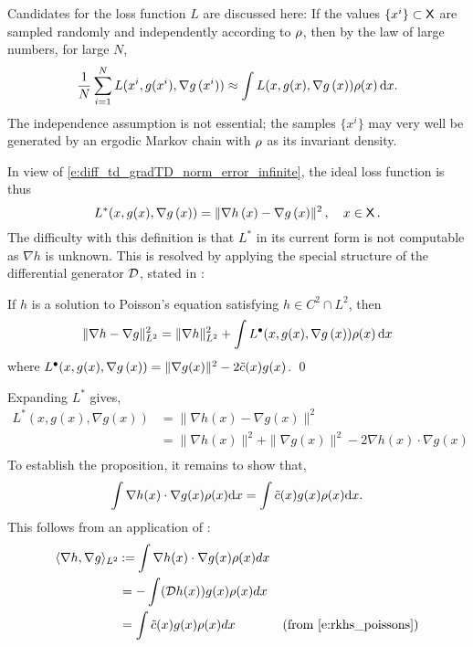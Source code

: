 Candidates for the loss function $L$ are discussed here: 
If the values $\{x^i\} \subset {\sf X} $  are sampled randomly and independently according to $\rho$,  then by the law of large numbers, for large $N$,
\begin{equation}
\frac{1}{N} \sum_{i=1}^N L(x^i, g(x^i), \nabla g\, (x^i))  \approx
\int  L(x, g(x), \nabla g\, (x))  \rho(x)\, \text{d} x.
\end{equation}
The independence assumption is not essential; the samples $\{x^i\}$ may very well be generated by an ergodic Markov chain with $\rho$ as its invariant density. 

In view of \eqref{e:diff_td_gradTD_norm_error_infinite}, the ideal loss function is thus
\begin{equation}
L^*(x,g(x) ,\nabla g \,(x))  =         \| \nabla h\,(x)  -\nabla g\, (x) \|^2\,, \quad x\in\state\,.
\label{e:rkhs_IdealLoss}
\end{equation}
The difficulty with this definition is that $L^*$ in its current form is not computable as $\nabla h$ is unknown. This is resolved by applying the special structure of the differential generator ${\cal D}$,  stated in :
\begin{proposition}
	\label{prop:gradTD_erm_loss}
	If $h$ is a solution to Poisson's equation satisfying $h\in C^2\cap L^2$, then
	\[
	\| \nabla h -  \nabla g\|^2_{L^2} =\| \nabla h  \|^2_{L^2} + \int   L^\bullet(x, g(x), \nabla g\, (x)) \rho(x)\, \text{d} x
	\]
	where
	$ L^\bullet(x, g(x), \nabla g\, (x)) =   \| \nabla g(x)\|^2   - 2 \tilde c(x) g(x)$.
	\qed
\end{proposition}
Expanding $L^*$ gives,	
\[
\begin{aligned}
L^*(x,g(x),\nabla g(x)) & = \| \nabla h(x) - \nabla g(x) \|^2 \\
& = \| \nabla h(x) \|^2 + \| \nabla g(x) \|^2- 2 \nabla h(x) \cdot \nabla g(x) \\
\end{aligned}
\]
To establish the proposition, it remains to show that,
\[
\int \nabla h(x) \cdot \nabla g(x) \pr(x) \ud x = \int \tilc(x) g(x) \pr(x) \ud x.
\label{e:rkhs_transform}
\]
This follows from an application of :
\[
\begin{aligned}
\langle \nabla h, \nabla g \rangle_{L^2} & \mathbin{:=} \int \nabla h(x) \cdot \nabla g(x) \rho(x) dx \\
& = - \int  ({\cal D} h(x)) g(x) \rho(x) dx \\
& = \int \tilde c(x) g(x) \rho(x) dx \qquad & \text{(from \eqref{e:rkhs_poissons})}
\end{aligned}
\]
